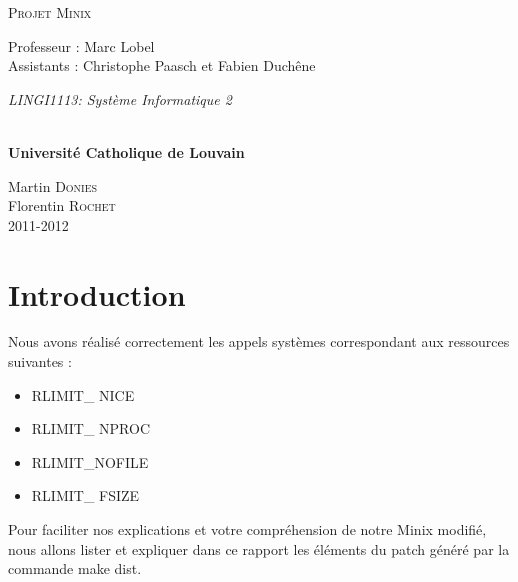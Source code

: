 \documentclass[9pt , a4paper]{article}
\begin{document}
  
  	\begin{titlepage}
		\begin{center}
			{\huge \textsc{Projet Minix}}\\
			\vspace{0.4cm}
			
			{\Large {Professeur : Marc Lobel \\ \vspace{0.2cm} Assistants : Christophe Paasch et Fabien Duchêne }}\\
			\vspace{0.6cm}
			
			{\Large \textit{ LINGI1113: Système Informatique 2}}\\
			\vspace{1.2cm}

			\texttt{}\\
			\vspace{0.2cm}
			\vspace{0.1cm}
			{\Large \textbf{Universit\'e Catholique de Louvain}}
			\vspace{0.7cm}

			\vspace{0.2cm}

			Martin \textsc{Donies} \\
			Florentin \textsc{Rochet} \\
			\vspace{0.2cm}
			2011-2012\\
		\end{center}
	\end{titlepage}

	\newpage
	
	\section{Introduction}
	
	Nous avons réalisé correctement les appels systèmes correspondant aux ressources suivantes : \\
	
	\begin{itemize}
		\item RLIMIT\_ NICE
		\item RLIMIT\_ NPROC
		\item RLIMIT\_NOFILE
		\item RLIMIT\_ FSIZE \\
	\end{itemize}
	
	Pour faciliter nos explications et votre compréhension de notre Minix modifié, nous allons lister et expliquer dans ce rapport  les éléments du patch généré par la commande make dist.
	
\end{document}
